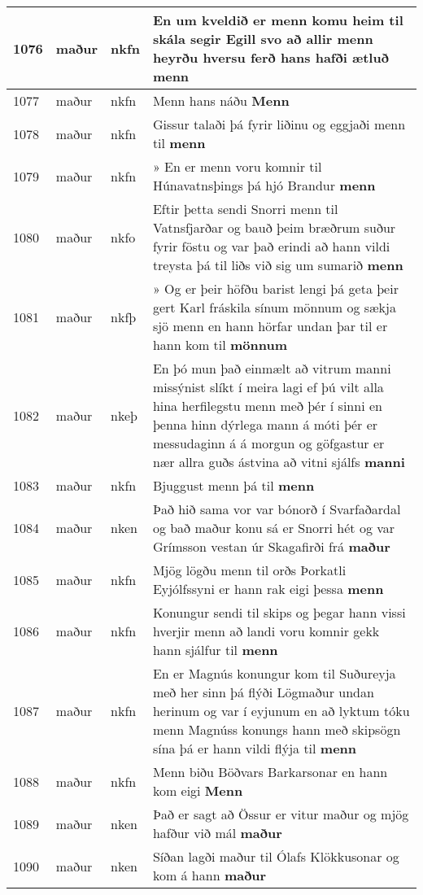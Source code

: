 \documentclass{article}
\begin{document}
\begin{longtable}{p{1cm}|p{1cm}|p{1cm}|p{13cm}}
\hline
1076&maður&nkfn&En um kveldið er menn komu heim til skála segir Egill svo að allir menn heyrðu hversu ferð hans hafði ætluð \textbf{menn} \\
\hline
1077&maður&nkfn&Menn hans náðu \textbf{Menn} \\
\hline
1078&maður&nkfn&Gissur talaði þá fyrir liðinu og eggjaði menn til \textbf{menn} \\
\hline
1079&maður&nkfn&» En er menn voru komnir til Húnavatnsþings þá hjó Brandur \textbf{menn} \\
\hline
1080&maður&nkfo&Eftir þetta sendi Snorri menn til Vatnsfjarðar og bauð þeim bræðrum suður fyrir föstu og var það erindi að hann vildi treysta þá til liðs við sig um sumarið \textbf{menn} \\
\hline
1081&maður&nkfþ&» Og er þeir höfðu barist lengi þá geta þeir gert Karl fráskila sínum mönnum og sækja sjö menn en hann hörfar undan þar til er hann kom til \textbf{mönnum} \\
\hline
1082&maður&nkeþ&En þó mun það einmælt að vitrum manni missýnist slíkt í meira lagi ef þú vilt alla hina herfilegstu menn með þér í sinni en þenna hinn dýrlega mann á móti þér er messudaginn á á morgun og göfgastur er nær allra guðs ástvina að vitni sjálfs \textbf{manni} \\
\hline
1083&maður&nkfn&Bjuggust menn þá til \textbf{menn} \\
\hline
1084&maður&nken&Það hið sama vor var bónorð í Svarfaðardal og bað maður konu sá er Snorri hét og var Grímsson vestan úr Skagafirði frá \textbf{maður} \\
\hline
1085&maður&nkfn&Mjög lögðu menn til orðs Þorkatli Eyjólfssyni er hann rak eigi þessa \textbf{menn} \\
\hline
1086&maður&nkfn&Konungur sendi til skips og þegar hann vissi hverjir menn að landi voru komnir gekk hann sjálfur til \textbf{menn} \\
\hline
1087&maður&nkfn&En er Magnús konungur kom til Suðureyja með her sinn þá flýði Lögmaður undan herinum og var í eyjunum en að lyktum tóku menn Magnúss konungs hann með skipsögn sína þá er hann vildi flýja til \textbf{menn} \\
\hline
1088&maður&nkfn&Menn biðu Böðvars Barkarsonar en hann kom eigi \textbf{Menn} \\
\hline
1089&maður&nken&Það er sagt að Össur er vitur maður og mjög hafður við mál \textbf{maður} \\
\hline
1090&maður&nken&Síðan lagði maður til Ólafs Klökkusonar og kom á hann \textbf{maður} \\

\end{longtable}
\end{document}
